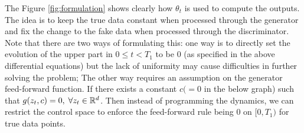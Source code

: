 The Figure \ref{fig:formulation} shows clearly how $\theta_t$ is used to compute the outputs. The idea is to keep the true data constant when processed through the generator and fix the change to the fake data when processed through the discriminator. Note that there are two ways of formulating this: one way is to directly set the evolution of the upper part in $0 \leq t < T_1$ to be $0$ (as specified in the above differential equations) but the lack of uniformity may cause difficulties in further solving the problem; The other way requires an assumption on the generator feed-forward function. If there exists a constant $c (=0$ in the below graph) such that $g(z_t, c) = 0, \; \forall z_t \in \mathbb{R}^d$. Then instead of programming the dynamics, we can restrict the control space to enforce the feed-forward rule being 0 on $[0,T_1)$ for true data points.


